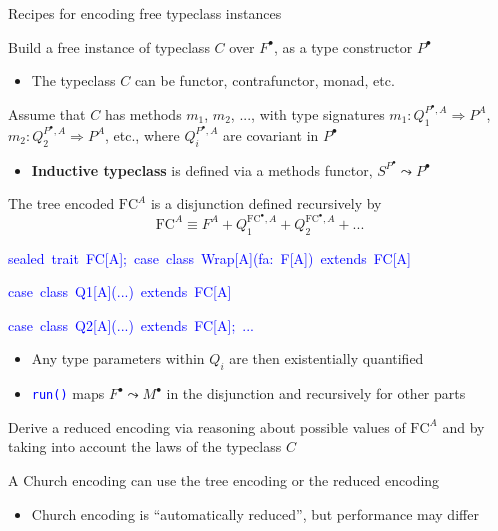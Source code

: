 \documentclass[english,,russian]{beamer}
\newenvironment{lyxcode}
  {\par\begin{list}{}{
    \setlength{\rightmargin}{\leftmargin}
    \setlength{\listparindent}{0pt}%
    \raggedright
    \setlength{\itemsep}{0pt}
    \setlength{\parsep}{0pt}
    \normalfont\ttfamily}%
   \def\{{\char`\{}
   \def\}{\char`\}}
   \def\textasciitilde{\char`\~}
   \item[]}
  {\end{list}}
\begin{document}
\begin{frame}{Recipes for encoding free typeclass instances}
\begin{itemize}
\item Build a free instance of typeclass $C$ over $F^{\bullet}$, as a
type constructor $P^{\bullet}$ 
\begin{itemize}
\item The typeclass $C$ can be functor, contrafunctor, monad, etc.
\end{itemize}
\item Assume that $C$ has methods $m_{1}$, $m_{2}$, ..., with type signatures
{\footnotesize{}$m_{1}:Q_{1}^{P^{\bullet},A}\Rightarrow P^{A}$},
{\footnotesize{}$m_{2}:Q_{2}^{P^{\bullet},A}\Rightarrow P^{A}$},
etc., where $Q_{i}^{P^{\bullet},A}$ are covariant in $P^{\bullet}$ 
\begin{itemize}
\item \textbf{Inductive typeclass} is defined via a methods functor, $S^{P^{\bullet}}\leadsto P^{\bullet}$
\end{itemize}
\item The tree encoded $\text{FC}^{A}$ is a disjunction defined recursively
by{\footnotesize{}
\[
\text{FC}^{A}\equiv F^{A}+Q_{1}^{\text{FC}^{\bullet},A}+Q_{2}^{\text{FC}^{\bullet},A}+...
\]
}{\footnotesize\par}
\begin{lyxcode}
{\footnotesize{}\vspace{-0.35cm}}\textcolor{blue}{\footnotesize{}sealed~trait~FC{[}A{]};~case~class~Wrap{[}A{]}(fa:~F{[}A{]})~extends~FC{[}A{]}}{\footnotesize\par}

\textcolor{blue}{\footnotesize{}case~class~Q1{[}A{]}(...)~extends~FC{[}A{]}}{\footnotesize\par}

\textcolor{blue}{\footnotesize{}case~class~Q2{[}A{]}(...)~extends~FC{[}A{]};~...}{\footnotesize\par}
\end{lyxcode}
\begin{itemize}
\item Any type parameters within $Q_{i}$ are then existentially quantified
\item \texttt{\textcolor{blue}{\footnotesize{}run()}} maps $F^{\bullet}\leadsto M^{\bullet}$
in the disjunction and recursively for other parts
\end{itemize}
\item Derive a reduced encoding via reasoning about possible values of $\text{FC}^{A}$
and by taking into account the laws of the typeclass $C$
\item A Church encoding can use the tree encoding or the reduced encoding
\begin{itemize}
\item Church encoding is ``automatically reduced'', but performance may
differ
\end{itemize}
\end{itemize}
\end{frame}
\end{document}

